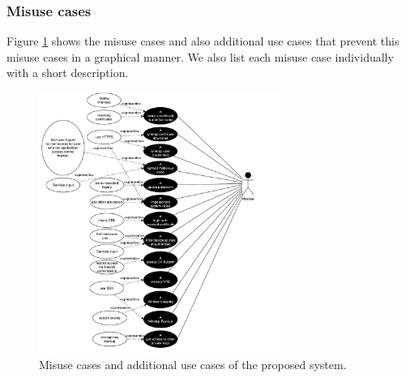 \documentclass[a4paper, toc=index, 12pt, DIV14, twoside, BCOR2cm, headsepline, numbers=noenddot, bibliography=totoc]{scrbook}
\begin{document}
\subsubsection{Misuse cases}
Figure \ref{misusecase} shows the misuse cases and also additional use cases that prevent this misuse cases in a graphical manner. We also list each misuse case individually with a short description.
\begin{figure}[H]
  \centering
    \includegraphics[width=0.7\textwidth]{images/misusediagram.pdf}  
  \caption{Misuse cases and additional use cases of the proposed system.}
  \label{misusecase}
\end{figure}
\end{document}
